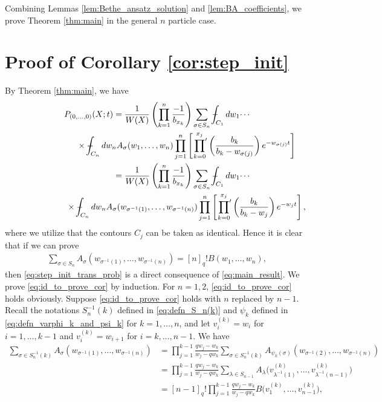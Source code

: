 \documentclass[pdftex]{sigma}
\numberwithin{equation}{section}
\def\Xint#1{\mathchoice
{\XXint\displaystyle\textstyle{#1}}%
{\XXint\textstyle\scriptstyle{#1}}%
{\XXint\scriptstyle\scriptscriptstyle{#1}}%
{\XXint\scriptscriptstyle\scriptscriptstyle{#1}}%
\!\int}
\def\XXint#1#2#3{{\setbox0=\hbox{$#1{#2#3}{\int}$}
\vcenter{\hbox{$#2#3$}}\kern-.5\wd0}}
\def\dashint{\Xint-}
\newcommand{\prodprime}{\sideset{}{'}\prod}
\begin{document}
Combining Lemmas \ref{lem:Bethe_ansatz_solution} and \ref{lem:BA_coefficients}, we prove Theorem \ref{thm:main} in the general $n$ particle case.

\section{Proof of Corollary \ref{cor:step_init}} \label{sec:proof_of_cor}

By Theorem \ref{thm:main}, we have
\begin{gather*}
  P_{(0, \dotsc, 0)}(X; t)
 =   \frac{1}{W(X)} \left( \prod^n_{k = 1} \frac{-1}{b_{x_k}} \right) \sum_{\sigma \in S_n} \dashint_{C_1} dw_1 \dotsi \\
 \hphantom{P_{(0, \dotsc, 0)}(X; t) =}{} \times \dashint_{C_n} dw_n A_{\sigma}(w_1, \dotsc, w_n) \prod^n_{j = 1} \left[ \prodprime^{x_j}_{k = 0} \left( \frac{b_k}{b_k - w_{\sigma(j)}} \right) e^{-w_{\sigma(j)} t} \right] \\
 \hphantom{P_{(0, \dotsc, 0)}(X; t)}{}
 =   \frac{1}{W(X)} \left( \prod^n_{k = 1} \frac{-1}{b_{x_k}} \right) \sum_{\sigma \in S_n} \dashint_{C_1} dw_1 \dotsi
\\
\hphantom{P_{(0, \dotsc, 0)}(X; t) =}{} \times
\dashint_{C_n} dw_n A_{\sigma}(w_{\sigma^{-1}(1)}, \dotsc, w_{\sigma^{-1}(n)}) \prod^n_{j = 1} \left[ \prodprime^{x_j}_{k = 0} \left( \frac{b_k}{b_k - w_j} \right) e^{-w_j t} \right],
\end{gather*}
where we utilize that the contours $C_j$ can be taken as identical. Hence it is clear that if we can prove
\begin{gather} \label{eq:id_to_prove_cor}
 \sum_{\sigma \in S_n} A_{\sigma}(w_{\sigma^{-1}(1)}, \dotsc, w_{\sigma^{-1}(n)}) = [n]_q! B(w_1, \dotsc, w_n),
\end{gather}
then \eqref{eq:step_init_trans_prob} is a direct consequence of \eqref{eq:main_result}. We prove \eqref{eq:id_to_prove_cor} by induction. For $n = 1, 2$, \eqref{eq:id_to_prove_cor} holds obviously. Suppose \eqref{eq:id_to_prove_cor} holds with $n$ replaced by $n - 1$. Recall the notations $S^{-1}_n(k)$ def\/ined in \eqref{eq:defn_S_n(k)} and $\psi_k$ def\/ined in \eqref{eq:defn_varphi_k_and_psi_k} for $k = 1, \dotsc, n$, and let $v^{(k)}_i = w_i$ for $i = 1, \dotsc, k - 1$ and $v^{(k)}_i = w_{i + 1}$ for $i = k, \dotsc, n - 1$. We have
\begin{align*}
 \sum_{\sigma \in S^{-1}_n(k)} A_{\sigma}(w_{\sigma^{-1}(1)}, \dotsc, w_{\sigma^{-1}(n)}) & =   \prod^{k - 1}_{j = 1} \frac{q w_j - w_k}{w_j - q w_k} \sum_{\sigma \in S^{-1}_n(k)} A_{\psi_k(\sigma)}(w_{\sigma^{-1}(2)}, \dotsc, w_{\sigma^{-1}(n)}) \nonumber\\
 &=   \prod^{k - 1}_{j = 1} \frac{q w_j - w_k}{w_j - q w_k} \sum_{\lambda \in S_{n - 1}} A_{\lambda}\big(v^{(k)}_{\lambda^{-1}(1)}, \dotsc, v^{(k)}_{\lambda^{-1}(n - 1)}\big) \nonumber\\
&  =   [n - 1]_q! \prod^{k - 1}_{j = 1} \frac{q w_j - w_k}{w_j - q w_k} B\big(v^{(k)}_1, \dotsc, v^{(k)}_{n - 1}\big),
\end{align*}
\end{document}
